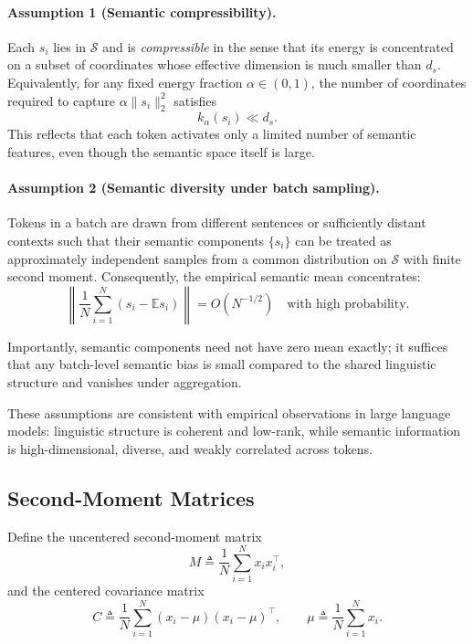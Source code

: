 \paragraph{Assumption 1 (Semantic compressibility).}
Each $s_i$ lies in $\mathcal{S}$ and is \emph{compressible} in the sense that
its energy is concentrated on a subset of coordinates whose effective dimension
is much smaller than $d_s$.
Equivalently, for any fixed energy fraction $\alpha \in (0,1)$, the number of
coordinates required to capture $\alpha\|s_i\|_2^2$ satisfies
\[
k_\alpha(s_i) \ll d_s.
\]
This reflects that each token activates only a limited number of semantic
features, even though the semantic space itself is large.

\paragraph{Assumption 2 (Semantic diversity under batch sampling).}
Tokens in a batch are drawn from different sentences or sufficiently distant
contexts such that their semantic components $\{s_i\}$ can be treated as
approximately independent samples from a common distribution on $\mathcal{S}$
with finite second moment.
Consequently, the empirical semantic mean concentrates:
\begin{equation}
\label{eq:semantic_mean_concentration}
\left\|
\frac{1}{N}\sum_{i=1}^N (s_i - \mathbb{E}s_i)
\right\|
= O(N^{-1/2})
\quad \text{with high probability}.
\end{equation}

Importantly, semantic components need not have zero mean exactly; it suffices
that any batch-level semantic bias is small compared to the shared linguistic
structure and vanishes under aggregation.

These assumptions are consistent with empirical observations in large language
models: linguistic structure is coherent and low-rank, while semantic information
is high-dimensional, diverse, and weakly correlated across tokens.

\subsection{Second-Moment Matrices}

Define the uncentered second-moment matrix
\begin{equation}
\label{eq:M_def}
M \triangleq \frac{1}{N}\sum_{i=1}^N x_i x_i^\top,
\end{equation}
and the centered covariance matrix
\begin{equation}
\label{eq:C_def}
C \triangleq \frac{1}{N}\sum_{i=1}^N (x_i - \mu)(x_i - \mu)^\top,
\qquad
\mu \triangleq \frac{1}{N}\sum_{i=1}^N x_i.
\end{equation}

